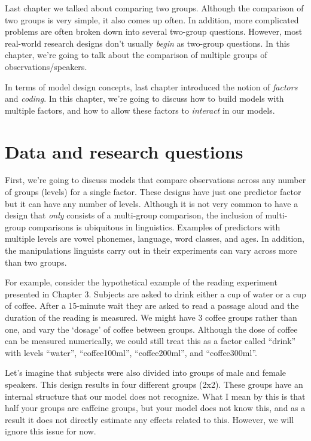 \documentclass[
]{book}
\begin{document}
Last chapter we talked about comparing two groups. Although the comparison of two groups is very simple, it also comes up often. In addition, more complicated problems are often broken down into several two-group questions. However, most real-world research designs don't usually \emph{begin} as two-group questions. In this chapter, we're going to talk about the comparison of multiple groups of observations/speakers.

In terms of model design concepts, last chapter introduced the notion of \emph{factors} and \emph{coding}. In this chapter, we're going to discuss how to build models with multiple factors, and how to allow these factors to \emph{interact} in our models.

\hypertarget{data-and-research-questions-3}{%
\section{Data and research questions}\label{data-and-research-questions-3}}

First, we're going to discuss models that compare observations across any number of groups (levels) for a single factor. These designs have just one predictor factor but it can have any number of levels. Although it is not very common to have a design that \emph{only} consists of a multi-group comparison, the inclusion of multi-group comparisons is ubiquitous in linguistics. Examples of predictors with multiple levels are vowel phonemes, language, word classes, and ages. In addition, the manipulations linguists carry out in their experiments can vary across more than two groups.

For example, consider the hypothetical example of the reading experiment presented in Chapter 3. Subjects are asked to drink either a cup of water or a cup of coffee. After a 15-minute wait they are asked to read a passage aloud and the duration of the reading is measured. We might have 3 coffee groups rather than one, and vary the `dosage' of coffee between groups. Although the dose of coffee can be measured numerically, we could still treat this as a factor called ``drink'' with levels ``water'', ``coffee100ml'', ``coffee200ml'', and ``coffee300ml''.

Let's imagine that subjects were also divided into groups of male and female speakers. This design results in four different groups (2x2). These groups have an internal structure that our model does not recognize. What I mean by this is that half your groups are caffeine groups, but your model does not know this, and as a result it does not directly estimate any effects related to this. However, we will ignore this issue for now.
\end{document}
